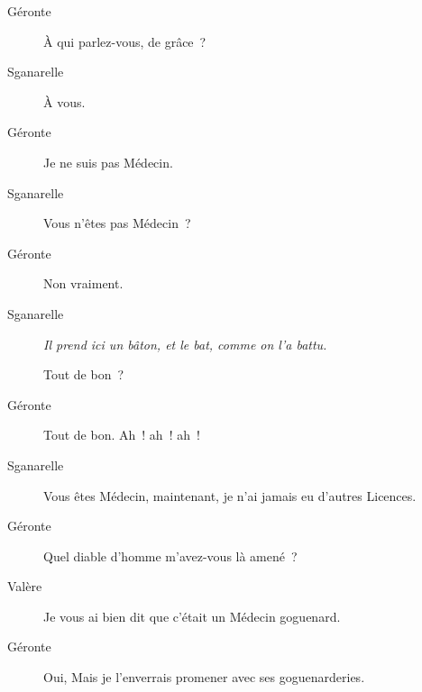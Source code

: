 \documentclass[french,twoside]{book} %
\begin{document}
 \begin{description} \item[Géronte] 

À qui parlez-vous, de grâce ?\end{description}
 \begin{description} \item[Sganarelle] 

À vous.\end{description}
 \begin{description} \item[Géronte] 

Je ne suis pas Médecin.\end{description}
 \begin{description} \item[Sganarelle] 

Vous n’êtes pas Médecin ?\end{description}
 \begin{description} \item[Géronte] 

Non vraiment.\end{description}
 \begin{description} \item[Sganarelle] \textit{Il prend ici un bâton, et le bat, comme on l’a battu.} 

Tout de bon ?\end{description}
 \begin{description} \item[Géronte] 

Tout de bon. Ah ! ah ! ah !\end{description}
 \begin{description} \item[Sganarelle] 

Vous êtes Médecin, maintenant, je n’ai jamais eu d’autres Licences.\end{description}
 \begin{description} \item[Géronte] 

Quel diable d’homme m’avez-vous là amené ?\end{description}
 \begin{description} \item[Valère] 

Je vous ai bien dit que c’était un Médecin goguenard.\end{description}
 \begin{description} \item[Géronte] 

Oui, Mais je l’enverrais promener avec ses goguenarderies.\end{description}
\end{document}
